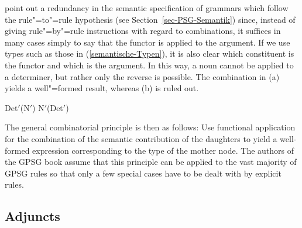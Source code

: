 \citet*[]{GKPS85a} point out a redundancy in the semantic specification of grammars which follow the rule"=to"=rule
hypothesis (see Section~\ref{sec-PSG-Semantik}) since, instead of giving rule"=by"=rule instructions with regard to combinations, it suffices in many cases simply
to say that the functor is applied to the argument. If we use types such as those in (\ref{semantische-Typen}), it is also clear which constituent is the functor
and which is the argument. In this way, a noun cannot be applied to a determiner, but rather only the reverse is possible. The combination in (a) yields a
well"=formed result, whereas (b) is ruled out.

\begin{samepage}
\eal
\ex Det$'$(N$'$)
\ex N$'$(Det$'$)
\zl
\end{samepage}

\noindent
The general combinatorial principle is then as follows:
\eanoraggedright
Use functional application for the combination of the semantic contribution of the daughters to yield a well-formed expression corresponding to the
type of the mother node.
\z
The authors of the GPSG book assume that this principle can be applied to the vast majority of GPSG rules so that only a few special cases have to be dealt
with by explicit rules.

\subsection{Adjuncts}
\label{Abschnitt-Adjunkte-GPSG}

